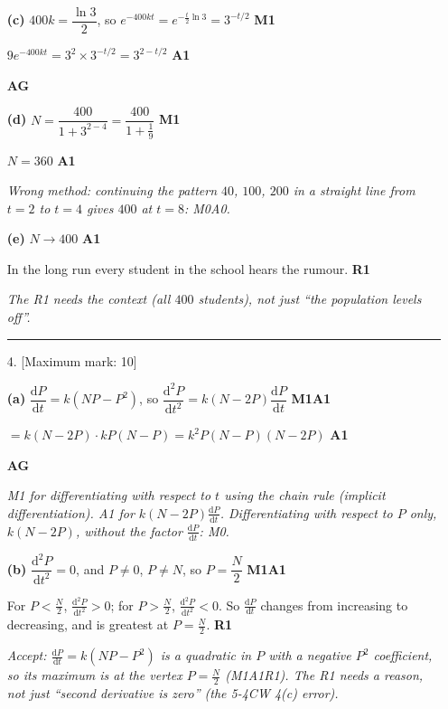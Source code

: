 \documentclass[12pt, twoside]{article}
\begin{document}
\begin{enumerate}[itemsep=0.3cm]
\textbf{(c)} $400k = \dfrac{\ln 3}{2}$, so
$e^{-400kt} = e^{-\frac{t}{2}\ln 3} = 3^{-t/2}$ \hfill \textbf{M1}

$9e^{-400kt} = 3^{2} \times 3^{-t/2} = 3^{2 - t/2}$ \hfill \textbf{A1}

\hfill \textbf{AG}

\textbf{(d)} $N = \dfrac{400}{1 + 3^{2 - 4}} = \dfrac{400}{1 + \frac{1}{9}}$
\hfill \textbf{M1}

$N = 360$ \hfill \textbf{A1}

\emph{Wrong method: continuing the pattern $40$, $100$, $200$ in a straight
line from $t = 2$ to $t = 4$ gives $400$ at $t = 8$: M0A0.}

\textbf{(e)} $N \to 400$ \hfill \textbf{A1}

In the long run every student in the school hears the rumour. \hfill \textbf{R1}

\emph{The R1 needs the context (all $400$ students), not just ``the
population levels off''.}

\bigskip \hrule \bigskip

\item[4.] [Maximum mark: 10]

\textbf{(a)} $\dfrac{\mathrm{d}P}{\mathrm{d}t} = k\left(NP - P^{2}\right)$, so
$\dfrac{\mathrm{d}^{2}P}{\mathrm{d}t^{2}} = k\left(N - 2P\right)\dfrac{\mathrm{d}P}{\mathrm{d}t}$
\hfill \textbf{M1A1}

$= k\left(N - 2P\right) \cdot kP\left(N - P\right)
= k^{2}P\left(N - P\right)\left(N - 2P\right)$ \hfill \textbf{A1}

\hfill \textbf{AG}

\emph{M1 for differentiating with respect to $t$ using the chain rule
(implicit differentiation). A1 for $k(N - 2P)\frac{\mathrm{d}P}{\mathrm{d}t}$.
Differentiating with respect to $P$ only, $k(N - 2P)$, without the factor
$\frac{\mathrm{d}P}{\mathrm{d}t}$: M0.}

\textbf{(b)} $\dfrac{\mathrm{d}^{2}P}{\mathrm{d}t^{2}} = 0$, and $P \neq 0$,
$P \neq N$, so $P = \dfrac{N}{2}$ \hfill \textbf{M1A1}

For $P < \frac{N}{2}$, $\frac{\mathrm{d}^{2}P}{\mathrm{d}t^{2}} > 0$; for
$P > \frac{N}{2}$, $\frac{\mathrm{d}^{2}P}{\mathrm{d}t^{2}} < 0$. So
$\frac{\mathrm{d}P}{\mathrm{d}t}$ changes from increasing to decreasing, and
is greatest at $P = \frac{N}{2}$. \hfill \textbf{R1}

\emph{Accept: $\frac{\mathrm{d}P}{\mathrm{d}t} = k(NP - P^{2})$ is a
quadratic in $P$ with a negative $P^{2}$ coefficient, so its maximum is at
the vertex $P = \frac{N}{2}$ (M1A1R1). The R1 needs a reason, not just
``second derivative is zero'' (the 5-4CW 4(c) error).}


\end{enumerate}
\end{document}
